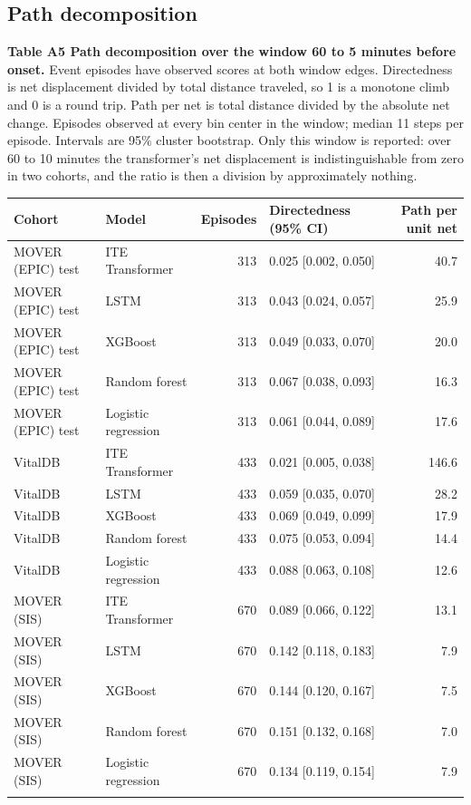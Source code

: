\subsection{Path decomposition}\label{path-decomposition}

\begin{minipage}{\linewidth}
\textbf{Table A5 \textbar{} Path decomposition over the window 60 to 5 minutes before onset.} Event
episodes have observed scores at both window edges. Directedness
is net displacement divided by total distance traveled, so 1 is a monotone climb and 0 is a
round trip. Path per net is total distance divided by the absolute net change. Episodes
observed at every bin center in the window; median 11 steps per episode. Intervals are 95\%
cluster bootstrap. Only this window is reported: over 60 to 10 minutes the transformer's net
displacement is indistinguishable from zero in two cohorts, and the ratio is then a division
by approximately nothing.

\vspace{0.5em}
\centering\footnotesize
\begin{tabular}{@{}llrlr@{}}
\toprule\noalign{}
Cohort & Model & Episodes & Directedness (95\% CI) & Path per unit net \\
\midrule\noalign{}
\bottomrule\noalign{}
MOVER (EPIC) test & ITE Transformer & 313 & 0.025 {[}0.002, 0.050{]} & 40.7 \\
MOVER (EPIC) test & LSTM & 313 & 0.043 {[}0.024, 0.057{]} & 25.9 \\
MOVER (EPIC) test & XGBoost & 313 & 0.049 {[}0.033, 0.070{]} & 20.0 \\
MOVER (EPIC) test & Random forest & 313 & 0.067 {[}0.038, 0.093{]} & 16.3 \\
MOVER (EPIC) test & Logistic regression & 313 & 0.061 {[}0.044, 0.089{]} & 17.6 \\
VitalDB & ITE Transformer & 433 & 0.021 {[}0.005, 0.038{]} & 146.6 \\
VitalDB & LSTM & 433 & 0.059 {[}0.035, 0.070{]} & 28.2 \\
VitalDB & XGBoost & 433 & 0.069 {[}0.049, 0.099{]} & 17.9 \\
VitalDB & Random forest & 433 & 0.075 {[}0.053, 0.094{]} & 14.4 \\
VitalDB & Logistic regression & 433 & 0.088 {[}0.063, 0.108{]} & 12.6 \\
MOVER (SIS) & ITE Transformer & 670 & 0.089 {[}0.066, 0.122{]} & 13.1 \\
MOVER (SIS) & LSTM & 670 & 0.142 {[}0.118, 0.183{]} & 7.9 \\
MOVER (SIS) & XGBoost & 670 & 0.144 {[}0.120, 0.167{]} & 7.5 \\
MOVER (SIS) & Random forest & 670 & 0.151 {[}0.132, 0.168{]} & 7.0 \\
MOVER (SIS) & Logistic regression & 670 & 0.134 {[}0.119, 0.154{]} & 7.9 \\
\bottomrule\noalign{}
\end{tabular}
\end{minipage}

